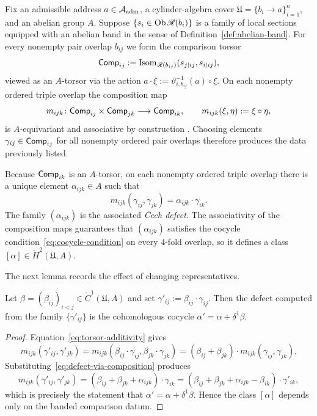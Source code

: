 \begin{definition}
\label{def:prefix-site-h2-gluing-obstruction}
Fix an admissible address $a\in\mathcal{A}_{\mathrm{adm}}$, a cylinder-algebra cover
$\mathfrak{U}=\{b_i\to a\}_{i=1}^n$, and an abelian group $A$.  Suppose
$\{s_i\in\operatorname{Ob}\mathscr{R}(b_i)\}$ is a family of local sections equipped with an
abelian band in the sense of Definition~\ref{def:abelian-band}.  For every
nonempty pair overlap $b_{ij}$ we form the comparison torsor
\[
\mathsf{Comp}_{ij}
:=
\operatorname{Isom}_{\mathscr{R}(b_{ij})}(s_{j|ij},s_{i|ij}),
\]
viewed as an $A$-torsor via the action $a\cdot\xi
:=\vartheta_{i,b_{ij}}^{-1}(a)\circ\xi$.  On each nonempty ordered triple
overlap the composition map
\[
m_{ijk}\colon \mathsf{Comp}_{ij}\times\mathsf{Comp}_{jk}\longrightarrow \mathsf{Comp}_{ik},
\qquad
m_{ijk}(\xi,\eta):=\xi\circ\eta,
\]
is $A$-equivariant and associative by construction
\cite[\S IV.3]{Giraud1971CohomologieNonAbelienne}.  Choosing elements
$\gamma_{ij}\in \mathsf{Comp}_{ij}$ for all nonempty ordered pair overlaps therefore
produces the data previously listed.

Because $\mathsf{Comp}_{ik}$ is an $A$-torsor, on each nonempty ordered triple overlap
there is a unique element $\alpha_{ijk}\in A$ such that
\begin{equation}\label{eq:defect-via-composition}
m_{ijk}(\gamma_{ij},\gamma_{jk})=\alpha_{ijk}\cdot \gamma_{ik}.
\end{equation}
The family $(\alpha_{ijk})$ is the associated \emph{\v{C}ech defect}.  The
associativity of the composition maps guarantees that $(\alpha_{ijk})$
satisfies the cocycle condition~\eqref{eq:cocycle-condition} on every
$4$-fold overlap, so it defines a class
$[\alpha]\in\check{H}^2(\mathfrak{U},A)$.
\end{definition}

The next lemma records the effect of changing representatives.

\begin{lemma}\label{lem:change-trivialization}
Let $\beta=(\beta_{ij})_{i<j}\in\check{C}^1(\mathfrak{U},A)$ and set
$\gamma'_{ij}:=\beta_{ij}\cdot \gamma_{ij}$.  Then the defect computed from the
family $\{\gamma'_{ij}\}$ is the cohomologous cocycle
$\alpha'=\alpha+\delta^1\beta$.
\end{lemma}

\begin{proof}
Equation~\eqref{eq:torsor-additivity} gives
\[
m_{ijk}(\gamma'_{ij},\gamma'_{jk})
=
m_{ijk}(\beta_{ij}\cdot\gamma_{ij},\beta_{jk}\cdot \gamma_{jk})
=
(\beta_{ij}+\beta_{jk})\cdot m_{ijk}(\gamma_{ij},\gamma_{jk}).
\]
Substituting~\eqref{eq:defect-via-composition} produces
\[
m_{ijk}(\gamma'_{ij},\gamma'_{jk})
=
(\beta_{ij}+\beta_{jk}+\alpha_{ijk})\cdot \gamma_{ik}
=
(\beta_{ij}+\beta_{jk}+\alpha_{ijk}-\beta_{ik})\cdot \gamma'_{ik},
\]
which is precisely the statement that $\alpha'=\alpha+\delta^1\beta$.  Hence
the class $[\alpha]$ depends only on the banded comparison datum.
\end{proof}

